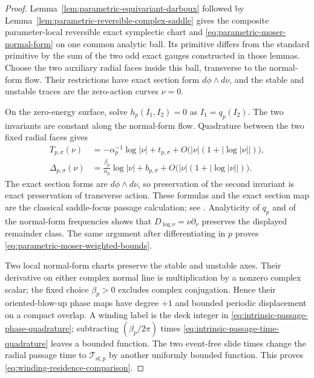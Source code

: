 \documentclass[11pt]{amsart}
\numberwithin{equation}{section}
\theoremstyle{definition}
\theoremstyle{remark}
\begin{document}
\begin{proof}
Lemma~\ref{lem:parametric-equivariant-darboux} followed by
Lemma~\ref{lem:parametric-reversible-complex-saddle} gives the composite
parameter-local reversible exact symplectic chart and
\eqref{eq:parametric-moser-normal-form} on one common analytic ball.  Its
primitive differs from the standard primitive by the sum of the two odd
exact gauges constructed in those lemmas.  Choose the two auxiliary radial
faces inside this ball, transverse to the normal-form flow.  Their
restrictions have exact section form $d\phi\wedge d\nu$, and the stable and
unstable traces are the zero-action curves $\nu=0$.

On the zero-energy surface, solve
$h_p(I_1,I_2)=0$ as $I_1=q_p(I_2)$.
The two invariants are constant along the normal-form flow.  Quadrature
between the two fixed radial faces gives
\begin{align}
 T_{p,\sigma}(\nu)
  &=-\alpha_p^{-1}\log|\nu|+t_{p,\sigma}
       +O\bigl(|\nu|(1+|\log|\nu||)\bigr),
 \label{eq:intrinsic-passage-time-quadrature}\\
 \Delta_{p,\sigma}(\nu)
  &=\frac{\beta_p}{\alpha_p}\log|\nu|+b_{p,\sigma}
       +O\bigl(|\nu|(1+|\log|\nu||)\bigr).
 \label{eq:intrinsic-passage-phase-quadrature}
\end{align}
The exact section forms are $d\phi\wedge d\nu$, so preservation of the
second invariant is exact preservation of transverse action.  These
formulas and the exact section map are the classical saddle-focus passage
calculation; see \cite[Section~2.1]{KoltsovaLerman2009Nontransverse}.
Analyticity of $q_p$ and of the normal-form frequencies shows that
$D_{\log\nu}=\nu\partial_\nu$ preserves the displayed remainder class.
The same argument after differentiating in $p$ proves
\eqref{eq:parametric-moser-weighted-bounds}.

Two local normal-form charts preserve the stable and unstable axes.  Their
derivative on either complex normal line is multiplication by a nonzero
complex scalar; the fixed choice $\beta_p>0$ excludes complex conjugation.
Hence their oriented-blow-up phase maps have degree $+1$ and bounded periodic
displacement on a compact overlap.  A winding label is the deck integer in
\eqref{eq:intrinsic-passage-phase-quadrature}; subtracting
$(\beta_p/2\pi)$ times
\eqref{eq:intrinsic-passage-time-quadrature} leaves a bounded function.
The two event-free slide times change the radial passage time to
$\mathcal T_{\mathrm{sf},p}$ by another uniformly bounded function.  This
proves \eqref{eq:winding-residence-comparison}.
\end{proof}
\end{document}
